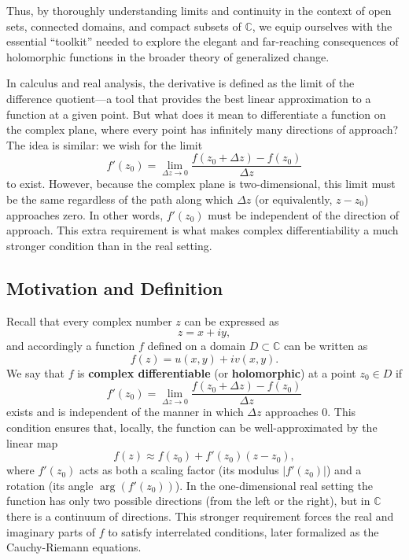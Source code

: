 \noindent Thus, by thoroughly understanding limits and continuity in the context of open sets, connected domains, and compact subsets of \(\mathbb{C}\), we equip ourselves with the essential “toolkit” needed to explore the elegant and far-reaching consequences of holomorphic functions in the broader theory of generalized change. 


\newpage




\newpage

 

\noindent In calculus and real analysis, the derivative is defined as the limit of the difference quotient—a tool that provides the best linear approximation to a function at a given point. But what does it mean to differentiate a function on the complex plane, where every point has infinitely many directions of approach? The idea is similar: we wish for the limit
\[
f'(z_0)=\lim_{\Delta z \to 0}\frac{f(z_0+\Delta z)-f(z_0)}{\Delta z}
\]
to exist. However, because the complex plane is two-dimensional, this limit must be the same regardless of the path along which \(\Delta z\) (or equivalently, \(z-z_0\)) approaches zero. In other words, \(f'(z_0)\) must be independent of the direction of approach. This extra requirement is what makes complex differentiability a much stronger condition than in the real setting.

\subsection*{Motivation and Definition} 

\noindent Recall that every complex number \(z\) can be expressed as
\[
z = x + iy,
\]
and accordingly a function \(f\) defined on a domain \(D\subset\mathbb{C}\) can be written as
\[
f(z)=u(x,y)+iv(x,y).
\]
We say that \(f\) is \textbf{complex differentiable} (or \textbf{holomorphic}) at a point \(z_0\in D\) if
\[
f'(z_0)=\lim_{\Delta z\to 0}\frac{f(z_0+\Delta z)-f(z_0)}{\Delta z}
\]
exists and is independent of the manner in which \(\Delta z\) approaches 0. This condition ensures that, locally, the function can be well-approximated by the linear map
\[
f(z) \approx f(z_0)+f'(z_0)(z-z_0),
\]
where \(f'(z_0)\) acts as both a scaling factor (its modulus \(|f'(z_0)|\)) and a rotation (its angle \(\arg(f'(z_0))\)). In the one-dimensional real setting the function has only two possible directions (from the left or the right), but in \(\mathbb{C}\) there is a continuum of directions. This stronger requirement forces the real and imaginary parts of \(f\) to satisfy interrelated conditions, later formalized as the Cauchy-Riemann equations. \\

